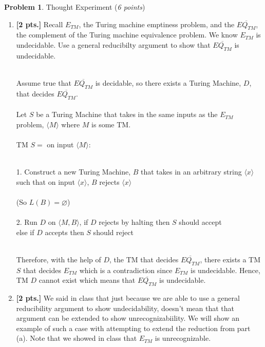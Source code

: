\documentclass[11pt]{article}
\theoremstyle{definition}
\theoremstyle{theorem}
\newtheorem{prob}{Problem}
\newcommand{\solution}{\medskip\noindent{\color{blue}\textbf{Solution:}}}
\begin{document}
\newpage

\begin{prob} Thought Experiment (\emph{6 points})\end{prob}


\begin{enumerate}[label=(\alph*)]

\item \textbf{[2 pts.]} Recall $E_{TM}$, the Turing machine emptiness problem, and the $\overline{EQ_{TM}}$, the complement of the Turing machine equivalence problem. We know $E_{TM}$ is undecidable. Use a general reducibilty argument to show that $\overline{EQ_{TM}}$ is undecidable.

\solution \\
Assume true that $\overline{EQ_{TM}}$ is decidable, so there exists a Turing Machine, $D$, that decides $\overline{EQ_{TM}}$. \\~\\
Let $S$ be a Turing Machine that takes in the same inputs as the $E_{TM}$ problem, $\langle M\rangle$ where $M$ is some TM. \\~\\
TM $S =$ on input $\langle M \rangle$: \\~\\
\hspace*{0.54cm}
\begin{minipage}{0.9\textwidth}
	1. Construct a new Turing Machine, $B$ that takes in an arbitrary string $\langle x \rangle$ such that on input $\langle x \rangle$, $B$ rejects $\langle x \rangle$\\~\\
	(So $L(B) = \varnothing$) \\~\\
	2. Run $D$ on $\langle M, B \rangle$, if $D$ rejects by halting then $S$ should accept \\
	else if $D$ accepts then $S$ should reject\\~\\
\end{minipage}

Therefore, with the help of $D$, the TM that decides $\overline{EQ_{TM}}$, there exists a TM $S$ that decides $E_{TM}$ which is a contradiction since $E_{TM}$ is undecidable. Hence, TM $D$ cannot exist which means that $\overline{EQ_{TM}}$ is undecidable.



\item \textbf{[2 pts.]}  We said in class that just because we are able to use a general reducibility argument to show undecidability, doesn't mean that that argument can be extended to show unrecognizabiility. We will show an example of such a case with attempting to extend the reduction from part (a). Note that we showed in class that $E_{TM}$ is unrecognizable. 


\end{enumerate}
\end{document}
